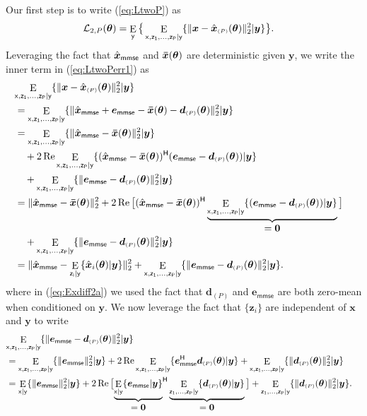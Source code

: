 \documentclass{article}
\theoremstyle{plain}
\theoremstyle{definition}
\theoremstyle{remark}
\newcommand{\ovec}[1]{\boldsymbol{\Bar{#1}}}
\newcommand{\hvec}[1]{\ensuremath{\Hat{\boldsymbol{#1}}}}
\renewcommand{\vec}[1]{\ensuremath{\boldsymbol{#1}}}
\newcommand{\mc}[1]{\ensuremath{\mathcal{#1}}}
\newcommand{\herm}{^{\textsf{H}}}
\DeclareMathOperator{\real}{Re}
\DeclareMathOperator{\E}{E}
\renewcommand{\eqref}[1]{(\ref{eq:#1})}
\newcommand{\mmse}{_{\mathsf{mmse}}}
\newcommand{\Ey}{\E_{\mathsf{y}}}
\newcommand{\Exgy}{\E_{\mathsf{x}|\mathsf{y}}}
\newcommand{\Ezigy}{\E_{\mathsf{z_i}|\mathsf{y}}}
\newcommand{\EzPgy}{\E_{\mathsf{z_1,...,z_P}|\mathsf{y}}}
\newcommand{\ExzPgy}{\E_{\mathsf{x,z_1,...,z_P}|\mathsf{y}}}
\newcommand{\LtwoP}{\mc{L}_{2,P}}
\newcommand{\avgP}{_{\scriptscriptstyle (P)}}
\begin{document}
Our first step is to write \eqref{LtwoP} as 
\begin{align}
\LtwoP(\vec{\theta})
&= \Ey\big\{ \ExzPgy\{\|\vec{x}-\hvec{x}\avgP(\vec{\theta})\|_2^2 | \vec{y}\} \big\} 
\label{eq:LtwoPerr1} .
\end{align}
Leveraging the fact that $\hvec{x}\mmse$ and $\ovec{x}(\vec{\theta})$ are deterministic given $\vec{y}$, we write the inner term in \eqref{LtwoPerr1} as
\begin{align}
\lefteqn{ \ExzPgy\{\|\vec{x}-\hvec{x}\avgP(\vec{\theta})\|_2^2 | \vec{y}\} }\nonumber\\
&= \ExzPgy\{\|\hvec{x}\mmse+\vec{e}\mmse-\ovec{x}(\vec{\theta})-\vec{d}\avgP(\vec{\theta})\|_2^2 | \vec{y}\} \\
&= \ExzPgy\{\|\hvec{x}\mmse-\ovec{x}(\vec{\theta})\|_2^2 | \vec{y}\} 
\nonumber\\&\quad
    + 2\real\ExzPgy\{(\hvec{x}\mmse-\ovec{x}(\vec{\theta}))\herm(\vec{e}\mmse-\vec{d}\avgP(\vec{\theta}))|\vec{y}\}
\nonumber\\&\quad
    + \ExzPgy\{\|\vec{e}\mmse-\vec{d}\avgP(\vec{\theta})\|_2^2 | \vec{y}\} \\
&= \|\hvec{x}\mmse-\ovec{x}(\vec{\theta})\|_2^2 
    + 2\real\big[(\hvec{x}\mmse-\ovec{x}(\vec{\theta}))\herm 
        \underbrace{\ExzPgy\{(\vec{e}\mmse-\vec{d}\avgP(\vec{\theta}))|\vec{y}\}}_{\displaystyle =\vec{0}}\big]
\nonumber\\&\quad
    + \ExzPgy\{\|\vec{e}\mmse-\vec{d}\avgP(\vec{\theta})\|_2^2 | \vec{y}\} \label{eq:Exdiff2a}\\
&= %
    \|\hvec{x}\mmse-\Ezigy\{\hvec{x}_i(\vec{\theta})|\vec{y}\}\|_2^2 
    + \ExzPgy\{\|\vec{e}\mmse-\vec{d}\avgP(\vec{\theta})\|_2^2 | \vec{y}\}
\label{eq:Exdiff2}.
\end{align}
where in \eqref{Exdiff2a} we used the fact that $\vec{d}\avgP$ and $\vec{e}\mmse$ are both zero-mean when conditioned on $\vec{y}$.
We now leverage the fact that $\{\vec{z}_i\}$ are independent of $\vec{x}$ and $\vec{y}$ to write
\begin{align}
\lefteqn{ \ExzPgy\{\|\vec{e}\mmse-\vec{d}\avgP(\vec{\theta})\|_2^2 | \vec{y}\} }\nonumber\\
&= \ExzPgy\{\|\vec{e}\mmse\|_2^2 | \vec{y}\}
    + 2\real\ExzPgy\{\vec{e}\mmse\herm\vec{d}\avgP(\vec{\theta}) | \vec{y}\}
    + \ExzPgy\{\|\vec{d}\avgP(\vec{\theta})\|_2^2 | \vec{y}\} \\
&= \Exgy\{\|\vec{e}\mmse\|_2^2 | \vec{y}\}
    + 2\real\big[{\underbrace{\Exgy\{\vec{e}\mmse | \vec{y}\}}_{\displaystyle =\vec{0}}}\herm
    \underbrace{\EzPgy\{\vec{d}\avgP(\vec{\theta}) | \vec{y}\}}_{\displaystyle =\vec{0}}\big] + \EzPgy\{\|\vec{d}\avgP(\vec{\theta})\|_2^2 | \vec{y}\} 
\label{eq:Eediff2}.
\end{align}
\end{document}
